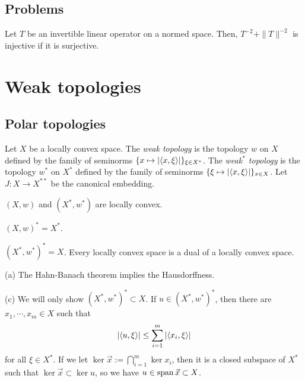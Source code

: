 \documentclass{../../large}
\begin{document}
\section*{Problems}
\begin{prb}
Let $T$ be an invertible linear operator on a normed space.
Then, $T^{-2}+\|T\|^{-2}$ is injective if it is surjective.
\end{prb}
















\chapter{Weak topologies}
\section{Polar topologies}

\begin{prb}[Bidual]
\end{prb}

\begin{prb}
Let $X$ be a locally convex space.
The \emph{weak topology} is the topology $w$ on $X$ defined by the family of seminorms $\{x\mapsto|\langle x,\xi\rangle|\}_{\xi\in X^*}$.
The \emph{weak$^*$ topology} is the topology $w^*$ on $X^*$ defined by the family of seminorms $\{\xi\mapsto|\langle x,\xi\rangle|\}_{x\in X}$.
Let $J:X\to X^{**}$ be the canonical embedding.
\begin{parts}
\item $(X,w)$ and $(X^*,w^*)$ are locally convex.
\item $(X,w)^*=X^*$.
\item $(X^*,w^*)^*=X$. Every locally convex space is a dual of a locally convex space.
\end{parts}
\end{prb}
\begin{pf}
(a)
The Hahn-Banach theorem implies the Hausdorffness.

(c)
We will only show $(X^*,w^*)^*\subset X$.
If $u\in(X^*,w^*)^*$, then there are $x_1,\cdots,x_m\in X$ such that
\[|\langle u,\xi\rangle|\le\sum_{i=1}^m|\langle x_i,\xi\rangle|\]
for all $\xi\in X^*$.
If we let $\ker\vec x:=\bigcap_{i=1}^m\ker x_i$, then it is a closed subspace of $X^*$ such that $\ker\vec x\subset\ker u$, so we have $u\in\operatorname{span}\vec x\subset X$.
\end{pf}
\end{document}
